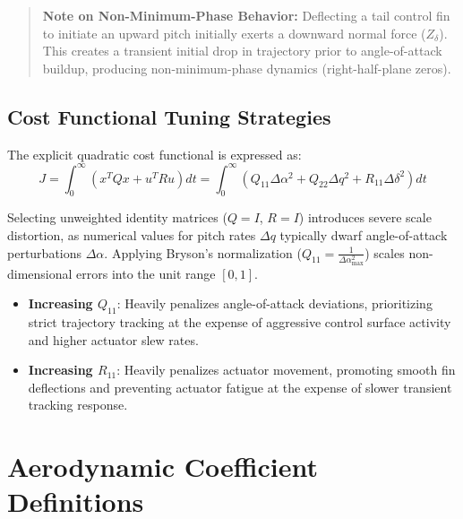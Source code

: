 \documentclass[11pt, a4paper]{article}
\begin{document}
\begin{quote}
\textbf{Note on Non-Minimum-Phase Behavior:} Deflecting a tail control fin to initiate an upward pitch initially exerts a downward normal force ($Z_\delta$). This creates a transient initial drop in trajectory prior to angle-of-attack buildup, producing non-minimum-phase dynamics (right-half-plane zeros).
\end{quote}

\subsection{Cost Functional Tuning Strategies}
The explicit quadratic cost functional is expressed as:
\begin{equation}
J = \int_0^\infty \left( x^T Q x + u^T R u \right) dt = \int_0^\infty \left( Q_{11} \Delta \alpha^2 + Q_{22} \Delta q^2 + R_{11} \Delta \delta^2 \right) dt
\end{equation}

Selecting unweighted identity matrices ($Q = I$, $R = I$) introduces severe scale distortion, as numerical values for pitch rates $\Delta q$ typically dwarf angle-of-attack perturbations $\Delta \alpha$. Applying Bryson's normalization ($Q_{11} = \frac{1}{\Delta \alpha_{\max}^2}$) scales non-dimensional errors into the unit range $[0, 1]$.
\begin{itemize}
    \item \textbf{Increasing $Q_{11}$}: Heavily penalizes angle-of-attack deviations, prioritizing strict trajectory tracking at the expense of aggressive control surface activity and higher actuator slew rates.
    \item \textbf{Increasing $R_{11}$}: Heavily penalizes actuator movement, promoting smooth fin deflections and preventing actuator fatigue at the expense of slower transient tracking response.
\end{itemize}


\section{Aerodynamic Coefficient Definitions}
\end{document}
